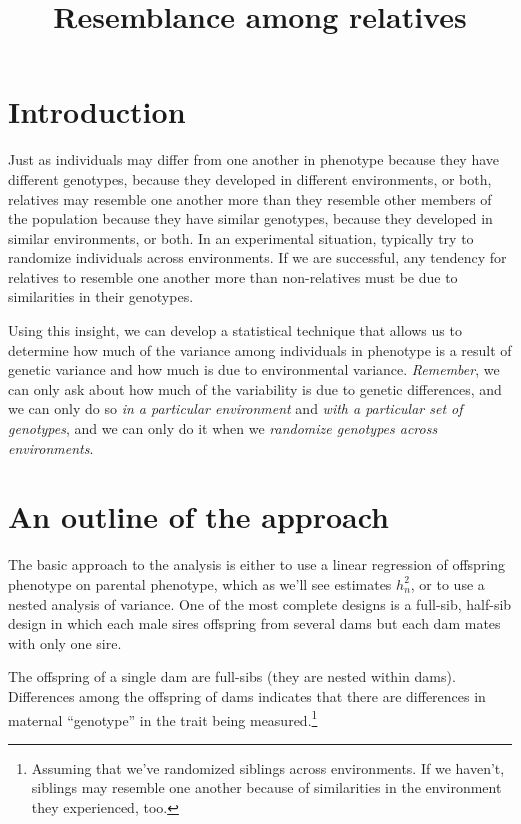 \documentclass[12pt]{article}
\title{Resemblance among relatives}
\begin{document}
\maketitle

\thispagestyle{first}

\section*{Introduction}

Just as individuals may differ from one another in phenotype because
they have different genotypes, because they developed in different
environments, or both, relatives may resemble one another more than
they resemble other members of the population because they have
similar genotypes, because they developed in similar environments, or
both. In an experimental situation, typically try to randomize
individuals across environments. If we are successful, any tendency
for relatives to resemble one another more than non-relatives must be
due to similarities in their genotypes.

Using this insight, we can develop a statistical technique that allows
us to determine how much of the variance among individuals in
phenotype is a result of genetic variance and how much is due to
environmental variance. {\it Remember}, we can only ask about how much
of the variability is due to genetic differences, and we can only do
so {\it in a particular environment\/} and {\it with a particular set
of genotypes}, and we can only do it when we {\it randomize genotypes
  across environments}.

\section*{An outline of the approach}

The basic approach to the analysis is either to use a linear
regression of offspring phenotype on parental phenotype, which as
we'll see estimates $h^2_n$, or to use a nested analysis of
variance. One of the most complete designs is a full-sib, half-sib
design in which each male sires offspring from several dams but each
dam mates with only one sire.

The offspring of a single dam are full-sibs (they are nested within
dams). Differences among the offspring of dams indicates that there
are differences in maternal ``genotype'' in the trait being
measured.\footnote{Assuming that we've randomized siblings across
  environments. If we haven't, siblings may resemble one another
  because of similarities in the environment they experienced, too.}
\end{document}
